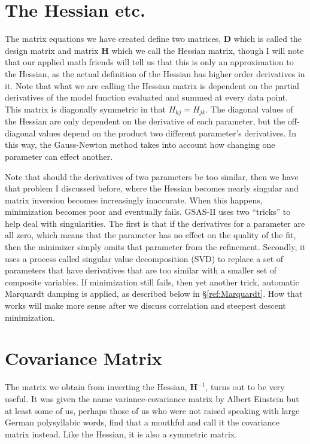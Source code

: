 \section{The Hessian etc.}
The matrix equations we have created define two matrices, $\textbf{D}$ which is called the design matrix and matrix $\textbf{H}$ which we call the Hessian matrix, though I will note that our applied math friends will tell us that this is only an approximation to the Hessian, as the actual definition of the Hessian has higher order derivatives in it. Note that what we are calling the Hessian matrix is dependent on the partial derivatives of the model function evaluated and summed at every data point. This matrix is diagonally symmetric in that $H_{kj} = H_{jk}$. The diagonal values of the Hessian are only dependent on the derivative of each parameter, but the off-diagonal values depend on the product two different parameter's derivatives. In this way, the Gauss-Newton method takes into account how changing one parameter can effect another. 

Note that should the derivatives of two parameters be too similar, then we have that problem I discussed before, where the Hessian becomes nearly singular and matrix inversion becomes increasingly inaccurate. When this happens, minimization becomes poor and eventually fails. GSAS-II uses two ``tricks'' to help deal with singularities. The first is that if the derivatives for a parameter are all zero, which means that the parameter has no effect on the quality of the fit, then the minimizer simply omits that parameter from the refinement. Secondly, it uses a process called singular value decomposition (SVD) to replace a set of parameters that have derivatives that are too similar with a smaller set of composite variables. If minimization still fails, then yet another trick, automatic Marquardt damping is applied, as described below in \S\ref{ref:Marquardt}. How that works will make more sense after we discuss correlation and steepest descent minimization. 

\section{Covariance Matrix}
The matrix we obtain from inverting the Hessian, $\textbf{H}^{-1}$, turns out to be very useful. It was given the name variance-covariance matrix by Albert Einstein but at least some of us, perhaps those of us who were not raised speaking with large German polysyllabic words, find that a mouthful and call it the covariance matrix instead. Like the Hessian, it is also a symmetric matrix.

